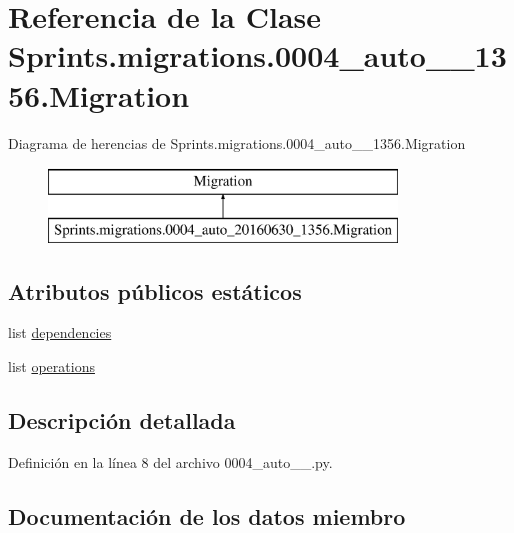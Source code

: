 \hypertarget{class_sprints_1_1migrations_1_10004__auto__20160630__1356_1_1_migration}{}\section{Referencia de la Clase Sprints.\+migrations.0004\+\_\+auto\+\_\+\_\+1356.Migration}
\label{class_sprints_1_1migrations_1_10004__auto__20160630__1356_1_1_migration}
Diagrama de herencias de Sprints.\+migrations.0004\+\_\+auto\+\_\+\_\+1356.Migration\begin{figure}[H]
\begin{center}
\leavevmode
\includegraphics[height=2.000000cm]{class_sprints_1_1migrations_1_10004__auto__20160630__1356_1_1_migration}
\end{center}
\end{figure}
\subsection*{Atributos públicos estáticos}
\begin{DoxyCompactItemize}
\item 
list \hyperlink{class_sprints_1_1migrations_1_10004__auto__20160630__1356_1_1_migration_a9cb705640fcc4ce3923b4dcc06719f06}{dependencies}
\item 
list \hyperlink{class_sprints_1_1migrations_1_10004__auto__20160630__1356_1_1_migration_acf10e0f603c056b3cc1e7762e78cf02c}{operations}
\end{DoxyCompactItemize}


\subsection{Descripción detallada}


Definición en la línea 8 del archivo 0004\+\_\+auto\+\_\+\_.\+py.



\subsection{Documentación de los datos miembro}
